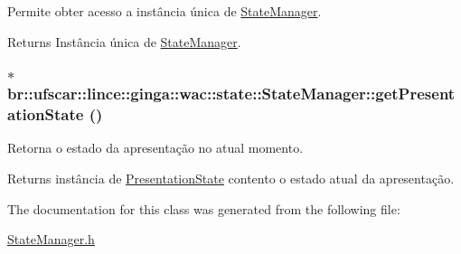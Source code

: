 Permite obter acesso a instância única de \hyperlink{classbr_1_1ufscar_1_1lince_1_1ginga_1_1wac_1_1state_1_1StateManager}{StateManager}. \begin{DoxyReturn}{Returns}
Instância única de \hyperlink{classbr_1_1ufscar_1_1lince_1_1ginga_1_1wac_1_1state_1_1StateManager}{StateManager}. 
\end{DoxyReturn}
\hypertarget{classbr_1_1ufscar_1_1lince_1_1ginga_1_1wac_1_1state_1_1StateManager_ab7c82f257bf2515985a54e65bf546da5}{
\subsubsection[{getPresentationState}]{$\ast$ br::ufscar::lince::ginga::wac::state::StateManager::getPresentationState ()}}
\label{classbr_1_1ufscar_1_1lince_1_1ginga_1_1wac_1_1state_1_1StateManager_ab7c82f257bf2515985a54e65bf546da5}


Retorna o estado da apresentação no atual momento. \begin{DoxyReturn}{Returns}
instância de \hyperlink{classbr_1_1ufscar_1_1lince_1_1ginga_1_1wac_1_1state_1_1PresentationState}{PresentationState} contento o estado atual da apresentação. 
\end{DoxyReturn}


The documentation for this class was generated from the following file:\begin{DoxyCompactItemize}
\item 
\hyperlink{StateManager_8h}{StateManager.h}\end{DoxyCompactItemize}
